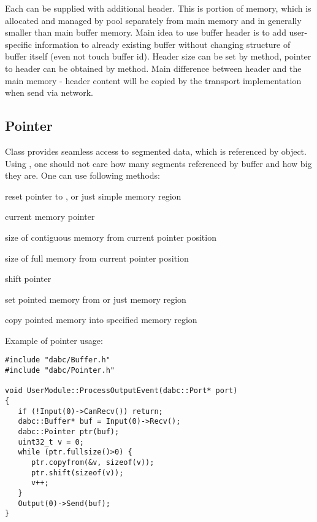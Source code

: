 Each  can be supplied with additional header. This is portion of 
memory, which is allocated and managed by pool separately from main memory and 
in generally  smaller than main buffer memory. 
Main idea to use buffer header is to add user-specific
information to already existing buffer without changing structure of buffer itself
(even not touch buffer id). 
Header size can be set by  method, pointer to header can be
obtained by  method.
Main difference between header and the main memory - header content will be copied by 
the transport implementation when send via network. 


\subsection{Pointer}

Class  provides seamless access to 
segmented data, which is referenced by  object.
Using , one should not care how many segments 
referenced by buffer and how big they are. One can use following methods:
\bbul
\item[\func{Pointer()} or \func{reset()}]  reset pointer to ,  or just simple memory region   
\item[\func{ptr()} or \func{operator()}]   current memory pointer
\item[\func{rawsize()}]   size of contiguous memory from current pointer position  
\item[\func{fullsize()}]  size of full memory from current pointer position
\item[\func{shift()}]  shift pointer    
\item[\func{copyfrom()}]  set pointed memory from  or just memory region
\item[\func{copyto()}]  copy pointed memory into specified memory region
\ebul   

Example of pointer usage:

\begin{small}
\begin{verbatim}     
#include "dabc/Buffer.h"
#include "dabc/Pointer.h"

void UserModule::ProcessOutputEvent(dabc::Port* port)
{
   if (!Input(0)->CanRecv()) return;
   dabc::Buffer* buf = Input(0)->Recv();
   dabc::Pointer ptr(buf);
   uint32_t v = 0; 
   while (ptr.fullsize()>0) {
      ptr.copyfrom(&v, sizeof(v));
      ptr.shift(sizeof(v));
      v++;
   }
   Output(0)->Send(buf);
}
\end{verbatim}     
\end{small}



